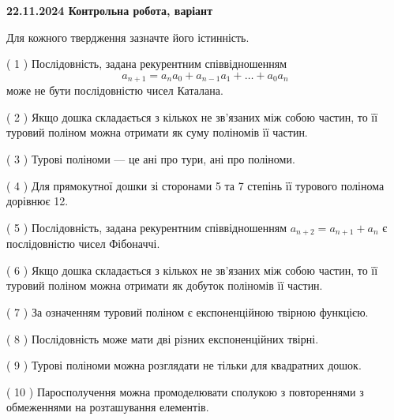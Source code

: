 \documentclass[12pt, ukrainian]{article}
\begin{document}
\vspace{4mm}
\newpage
\begin {large}

\textbf{22.11.2024 Контрольна робота, варіант  }\par


{
Для кожного твердження зазначте його істинність.\par
\vspace{2mm}
( 1 ) Послідовність, задана рекурентним співвідношенням $$a_{n+1}=a_{n}a_{0}+a_{n-1}a_{1}+\ldots+a_0a_{n}$$ може не бути послідовністю чисел Каталана.%

( 2 ) Якщо дошка складається з кількох не зв’язаних між собою частин, то її туровий поліном можна отримати як суму поліномів її частин.%

( 3 ) Турові поліноми --- це ані про тури, ані про поліноми.%

( 4 ) Для прямокутної дошки зі сторонами 5 та 7 степінь її турового полінома дорівнює 12.%

( 5 ) Послідовність, задана рекурентним співвідношенням $a_{n+2}=a_{n+1}+a_{n}$ є послідовністю чисел Фібоначчі.%

( 6 ) Якщо дошка складається з кількох не зв’язаних між собою частин, то її туровий поліном можна отримати як добуток поліномів її частин.%

( 7 ) За означенням туровий поліном є експоненційною твірною функцією.%

( 8 ) Послідовність може мати дві різних експоненційних твірні.%

( 9 ) Турові поліноми можна розглядати не тільки для квадратних дошок.%

( 10 ) Паросполучення можна промоделювати сполукою з повтореннями з обмеженнями на розташування елементів.%


\vspace{5mm}
}
\end {large}
\end{document}
